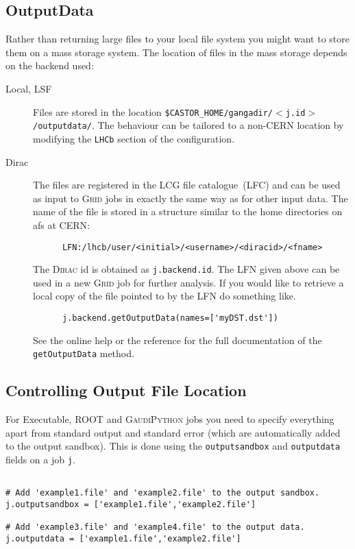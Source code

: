 \documentclass{howto}
\def\root {\textsc{ROOT}\xspace}
\def\gaudipython {\textsc{GaudiPython}\xspace}
\def\dirac {\textsc{Dirac}\xspace}
\def\grid {\textsc{Grid}\xspace}
\begin{document}
\subsection{OutputData}
\label{sec:OutputData}
Rather than returning large files to your local file system you might want to
store them on a mass storage system. 
The location of files in the mass storage depends on the backend used:
\begin{description}
\item[Local, LSF] Files are stored in the location
  \texttt{\$CASTOR_HOME/gangadir/$<$j.id$>$/outputdata/}. The behaviour can be
  tailored to a non-CERN location by modifying the \texttt{LHCb} section of
  the configuration.
\item[Dirac] The files are registered in the LCG file catalogue~(LFC) and can
  be used as input to \grid jobs in exactly the same way as for other input
  data. The name of the file is stored in a structure similar to the home
  directories on afs at CERN:
\begin{verbatim}
      LFN:/lhcb/user/<initial>/<username>/<diracid>/<fname> 
\end{verbatim}
  The \dirac id is obtained as \texttt{j.backend.id}. The LFN given above can
  be used in a new \grid job for further analysis. If you would like to
  retrieve a local copy of the file pointed to by the LFN do something like.
\begin{verbatim}
      j.backend.getOutputData(names=['myDST.dst'])
\end{verbatim}
  See the online help or the reference for the full documentation of the
  \texttt{getOutputData} method.
\end{description}

\subsection{Controlling Output File Location}
\label{sec:CtrlOutLoc}

For Executable, \root and \gaudipython jobs you need to specify everything 
apart from standard output and standard error (which are automatically added
to the output sandbox). This is done using the \texttt{outputsandbox} and
\texttt{outputdata} fields on a job \texttt{j}.

\begin{verbatim}

# Add 'example1.file' and 'example2.file' to the output sandbox.
j.outputsandbox = ['example1.file','example2.file']

# Add 'example3.file' and 'example4.file' to the output data.
j.outputdata = ['example1.file','example2.file']

\end{verbatim}
\end{document}
